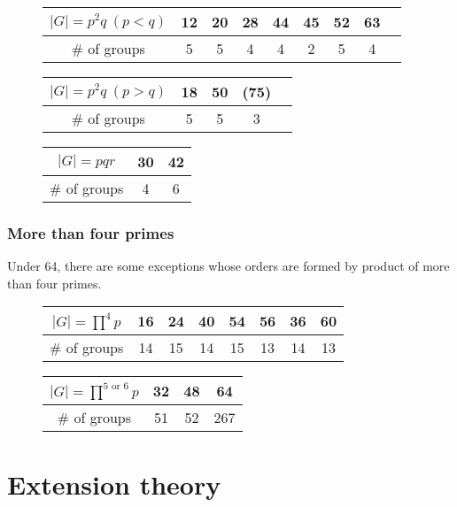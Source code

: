 \documentclass{../exp}
\begin{document}
\begin{ex}[$|G|=pqr$]
\end{ex}



\begin{figure}[h!]
\begin{tabular}{c|c|ccccccc}
\hline
$|G|=p^2q\ (p<q)$&12&20&28&44&45&52&63\\
\hline
$\#$ of groups&5&5&4&4&2&5&4\\
\hline
\end{tabular}
\vspace{10pt}

\begin{tabular}{c|cccc}
\hline
$|G|=p^2q\ (p>q)$&18&50&(75)\\
\hline
$\#$ of groups&5&5&3\\
\hline
\end{tabular}
\hspace{10pt}
\begin{tabular}{c|cc}
\hline
$|G|=pqr$&30&42\\
\hline
$\#$ of groups&4&6\\
\hline
\end{tabular}
\end{figure}




\subsubsection{More than four primes}
Under 64, there are some exceptions whose orders are formed by product of more than four primes.
\begin{figure}[h!]
\begin{tabular}{c|c|cccc|c|c}
\hline
$|G|=\prod^4p$&16&24&40&54&56&36&60\\
\hline
$\#$ of groups&14&15&14&15&13&14&13\\
\hline
\end{tabular}
\vspace{10pt}

\begin{tabular}{c|c|c||c}
\hline
$|G|=\prod^{5\text{ or }6}p$&32&48&64\\
\hline
$\#$ of groups&51&52&267\\
\hline
\end{tabular}
\end{figure}






\section{Extension theory}
\end{document}
